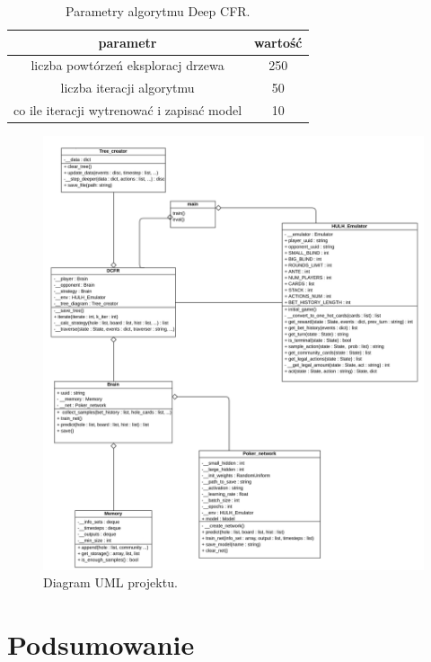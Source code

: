 \documentclass[12pt,oneside,a4paper]{report}
\begin{document}
\begin{table}[h!]
\centering
\caption{Parametry algorytmu Deep CFR.}
\begin{tabular}{|c|c| }
   \hline
   parametr & wartość \\
    \hline
   liczba powtórzeń eksploracj drzewa & 250  \\ 
   \hline
   liczba iteracji algorytmu & 50  \\  
   \hline
   co ile iteracji wytrenować i zapisać model & 10 \\
   \hline
\end{tabular}
\end{table}





\begin{figure}[!ht]
  \centering
  \hspace*{-1cm}   
  \includegraphics[width=1.1\textwidth]{./img/uml.pdf}
  \caption{Diagram UML projektu.}
\end{figure}

\section{Podsumowanie}
\end{document}
